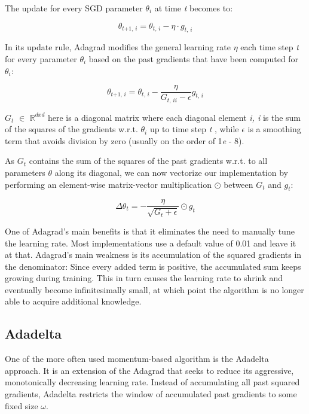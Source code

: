 \documentclass[12pt,oneside,a4paper,parskip]{scrbook}
\newcommand{\R}{\mathbb{R}}
\begin{document}
The update for every SGD parameter $\theta_i$ at time \textit{t} becomes to:

\begin{equation}
  \theta_\textit{t+1, i} = \theta_\textit{t, i} - \eta \cdot \textit{g}_\textit{t, i}
\end{equation}

In its update rule, Adagrad modifies the general learning rate $\eta$ each time step \textit{t} for every parameter
$\theta_i$ based on the past gradients that have been computed for $\theta_i$:

\begin{equation}
  \theta_\textit{t+1, i} = \theta_\textit{t, i}-\frac{\eta}{\textit{G}_\textit{t, ii} - \epsilon} \textit{g}_\textit{t, i}
\end{equation}

$\textit{G}_t$ $\in$ $\R^\textit{dxd}$ here is a diagonal matrix where each diagonal element \textit{i, i} is the sum of the
squares of the gradients w.r.t. $\theta_i$ up to time step \textit{t} \cite{AdadeltaAddition}, while $\epsilon$ is a smoothing term that avoids
division by zero (usually on the order of 1\textit{e} - 8). 

As $\textit{G}_t$ contains the sum of the squares of the past gradients w.r.t. to all parameters $\theta$ along its
diagonal, we can now vectorize our implementation by performing an element-wise matrix-vector multiplication $\odot$
between $\textit{G}_t$ and $\textit{g}_t$:

\begin{equation}
  \Delta\theta_\textit{t} = -\frac{\eta}{\sqrt{\textit{G}_\textit{t} + \epsilon}} \odot \textit{g}_\textit{t}
  \label{equ:Adagrad_2}
\end{equation}

One of Adagrad’s main benefits is that it eliminates the need to manually tune the learning rate. Most implementations 
use a default value of 0.01 and leave it at that.
Adagrad’s main weakness is its accumulation of the squared gradients in the denominator: Since every added term is 
positive, the accumulated sum keeps growing during training. This in turn causes the learning rate to shrink and eventually
become infinitesimally small, at which point the algorithm is no longer able to acquire additional knowledge. \cite{overvieDiffRSLVQ}

\subsection{Adadelta}
One of the more often used momentum-based algorithm is the Adadelta approach. It is an extension of the Adagrad that 
seeks to reduce its aggressive, monotonically decreasing learning rate. Instead of accumulating all past squared gradients, 
Adadelta restricts the window of accumulated past gradients to some fixed size $\omega$.  
\end{document}
